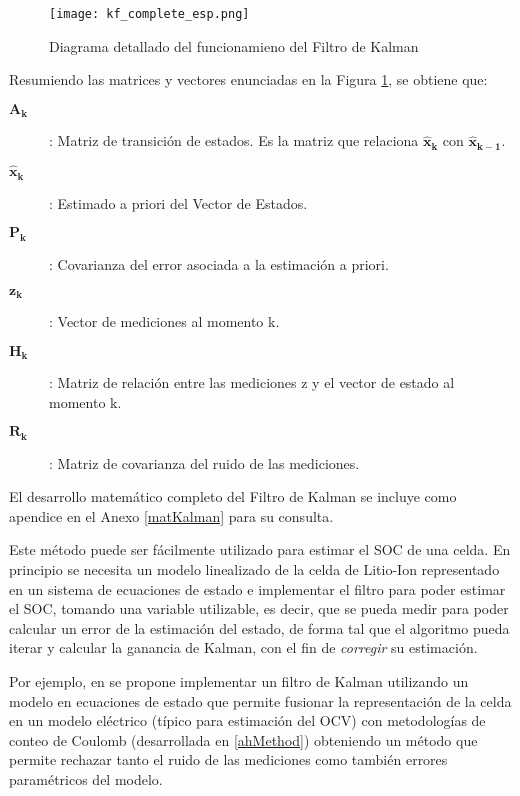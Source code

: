 \begin{figure}[h!]
    \begin{center}
        \texttt{[image: kf\_complete\_esp.png]}
        \caption{Diagrama detallado del funcionamieno del Filtro de Kalman}
        \label{complete_kf}
    \end{center}
\end{figure}
\FloatBarrier

Resumiendo las matrices y vectores enunciadas en la Figura \ref{complete_kf}, se
obtiene que:

\begin{description}
    \item [$\mathbf{A_{k}}$]: Matriz de transición de estados. Es la matriz que
        relaciona $\mathbf{\hat{x}_{k}}$ con $\mathbf{\hat{x}_{k-1}}$.
    \item [$\mathbf{\hat{x}_{k}}$]: Estimado a priori del Vector de Estados.
    \item [$\mathbf{P_{k}}$]: Covarianza del error asociada a la estimación a priori.
    \item [$\mathbf{z_{k}}$]: Vector de mediciones al momento k.
    \item [$\mathbf{H_{k}}$]: Matriz de relación entre las mediciones z y el vector de
        estado al momento k.
    \item [$\mathbf{R_{k}}$]: Matriz de covarianza del ruido de las mediciones.
\end{description}

El desarrollo matemático completo del Filtro de Kalman se incluye como apendice
en el Anexo \ref{matKalman} para su consulta.

\noindent Este m\'etodo puede ser f\'acilmente utilizado para estimar el 
\acrshort{SOC} de una celda. En principio se necesita un modelo linealizado de la 
celda de Litio-Ion representado en un sistema de ecuaciones de estado e 
implementar el filtro para poder estimar el \acrshort{SOC}, tomando una variable 
utilizable, es decir, que se pueda medir para poder calcular un error de la 
estimaci\'on del estado, de forma tal que el algoritmo pueda iterar y calcular 
la ganancia de Kalman, con el fin de \emph{corregir} su estimaci\'on.

\noindent Por ejemplo, en \cite{spagnol_kalman} se propone implementar un filtro 
de Kalman utilizando un modelo en ecuaciones de estado que permite fusionar la
representaci\'on de la celda en un modelo el\'ectrico (t\'ipico para
estimaci\'on del \acrshort{OCV}) con metodolog\'ias de conteo de Coulomb
(desarrollada en \ref{ahMethod}) obteniendo un m\'etodo que permite rechazar
tanto el ruido de las mediciones como tambi\'en errores param\'etricos del
modelo.

